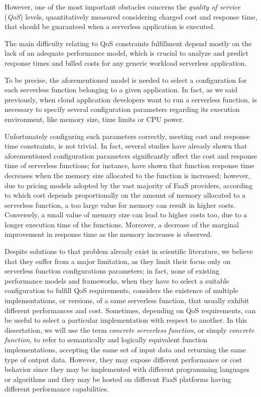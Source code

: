 \documentclass[12pt,a4paper]{report}
\begin{document}
However, one of the most important obstacles concerns the \textit{quality of service} (\textit{QoS}) levels, quantitatively measured considering charged cost and response time, that should be guaranteed when a serverless application is executed.

The main difficulty relating to QoS constraints fulfillment depend mostly on the lack of an adequate performance model, which is crucial to analyze and predict response times and billed costs for any generic workload serverless application. 

To be precise, the aforementioned model is needed to select a configuration for each serverless function belonging to a given application. In fact, as we said previously, when cloud application developers want to run a serverless function, is necessary to specify several configuration parameters regarding its execution environment, like memory size, time limits or CPU power.

Unfortunately configuring such parameters correctly, meeting cost and response time constraints, is not trivial. In fact, several studies have already shown that aforementioned configuration parameters significantly affect the cost and response time of serverless functions; for instance, \citet{COSE} have shown that function response time decreases when the memory size allocated to the function is increased; however, due to pricing models adopted by the vast majority of FaaS providers, according to which cost depends proportionally on the amount of memory allocated to a serverless function, a too large value for memory can result in higher costs. Conversely, a small value of memory size can lead to higher costs too, due to a longer execution time of the functions. Moreover, a decrease of the marginal improvement in response time as the memory increases is observed.

Despite solutions to that problem already exist in scientific literature, we believe that they suffer from a major limitation, as they limit their focus only on serverless function configurations parameters; in fact, none of existing performance models and frameworks, when they have to select a suitable configuration to fulfill QoS requirements, considers the existence of multiple implementations, or versions, of a same serverless function, that usually exhibit different performances and cost. Sometimes, depending on QoS requirements, can be useful to select a particular implementation with respect to another. In this dissertation, we will use the term \textit{concrete serverless function}, or simply \textit{concrete function}, to refer to semantically and logically equivalent function implementations, accepting the same set of input data and returning the same type of output data. However, they may expose different performance or cost behavior since they may be implemented with different programming languages or algorithms and they may be hosted on different FaaS platforms having different performance capabilities.
\end{document}
